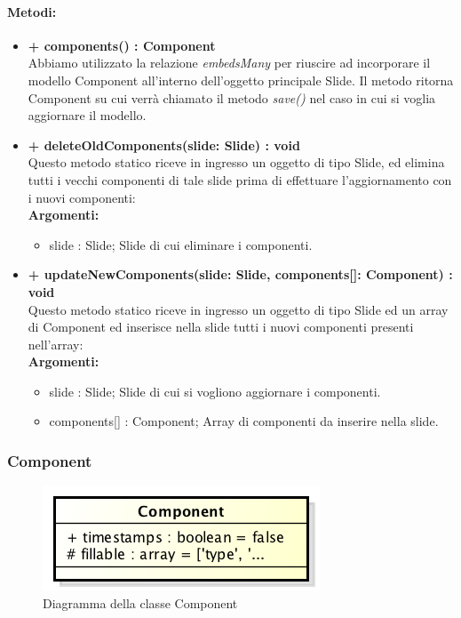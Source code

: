 	\paragraph{Metodi:}
	\begin{itemize}
		\item \textbf{+ components() : Component}\\
		Abbiamo utilizzato la relazione \textit{embedsMany} per riuscire ad incorporare il modello Component all'interno dell'oggetto principale \gls{Slide}. Il metodo ritorna Component su cui verrà chiamato il metodo \textit{save()} nel caso in cui si voglia aggiornare il modello.
		\item \textbf{+ deleteOldComponents(slide: Slide) : void}\\
		Questo metodo statico riceve in ingresso un oggetto di tipo \gls{Slide}, ed elimina tutti i vecchi componenti di tale \gls{slide} prima di effettuare l'aggiornamento con i nuovi componenti:\\
		\textbf{Argomenti:}
		\begin{itemize}
			\item \gls{slide} : \gls{Slide};
			\gls{Slide} di cui eliminare i componenti.
		\end{itemize}
		\newpage
		\item \textbf{+ updateNewComponents(slide: Slide, components[]: Component) : void}\\
		Questo metodo statico riceve in ingresso un oggetto di tipo \gls{Slide} ed un array di Component ed inserisce nella \gls{slide} tutti i nuovi componenti presenti nell'array:\\
		\textbf{Argomenti:}
		\begin{itemize}
			\item slide : Slide;
			\gls{Slide} di cui si vogliono aggiornare i componenti.
			\item components[] : Component;
			Array di componenti da inserire nella \gls{slide}.
		\end{itemize}
	\end{itemize}
	\newpage
	

\subsubsection{Component}

	\begin{figure}[h]
		\centering
		\includegraphics[width=0.5\linewidth]{img/back_end_premi_model_component}
		\caption[Diagramma della classe Component]{Diagramma della classe Component}
		\label{fig:back_end_premi_model_component}
	\end{figure}


